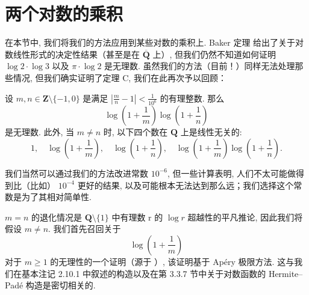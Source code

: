 \section{两个对数的乘积}\label{sec:14}

在本节中, 我们将我们的方法应用到某些对数的乘积上. 
Baker 定理 \cite{Bak64} 给出了关于对数线性形式的决定性结果（甚至是在 \(\overline{\mathbf{Q}}\) 上）, 
但我们仍然不知道如何证明 \(\log 2 \cdot \log 3\) 以及 \(\pi \cdot \log 2\) 是无理数. 
虽然我们的方法（目前！）同样无法处理那些情况, 但我们确实证明了定理 C, 我们在此再次予以回顾：

\begin{theorem}\label{thm:14.0.1}
设 \(m, n \in \mathbf{Z} \setminus \{-1, 0\}\) 是满足 \(\left| \frac{m}{n} - 1 \right| < \frac{1}{10^6}\) 的有理整数. 
那么
\begin{equation}\label{eq:14.0.2}
\log\left(1 + \frac{1}{m}\right)\log\left(1 + \frac{1}{n}\right)
\end{equation}
是无理数. 
此外, 当 \(m \neq n\) 时, 以下四个数在 \(\mathbf{Q}\) 上是线性无关的:
\begin{equation}\label{eq:14.0.3}
1, \quad \log\left(1+\frac{1}{m}\right), \quad \log\left(1+\frac{1}{n}\right), \quad \log\left(1+\frac{1}{m}\right)\log\left(1+\frac{1}{n}\right).
\end{equation}
\end{theorem}

\begin{remark}\label{rem:14.0.4}
我们当然可以通过我们的方法改进常数 \(10^{-6}\), 
但一些计算表明, 人们不太可能做得到比（比如） \(10^{-4}\) 更好的结果, 
以及可能根本无法达到那么远；我们选择这个常数是为了其相对简单性. \end{remark}

\(m=n\) 的退化情况是 \(\mathbf{Q} \setminus \{1\}\) 中有理数 r 的 \(\log r\) 超越性的平凡推论, 
因此我们将假设 \(m \neq n\). 
我们首先召回关于
\begin{equation}\label{eq:14.0.5}
\log\left(1 + \frac{1}{m}\right)
\end{equation}
对于 \(m \geq 1\) 的无理性的一个证明（源于 \cite{AR80}\cite{Chu79}\cite{vdP79}）, 该证明基于 Ap{\'e}ry 极限方法. 
这与我们在基本注记 2.10.1 中叙述的构造以及在第 3.3.7 节中关于对数函数的 Hermite--Pad{\'e} 构造是密切相关的.

